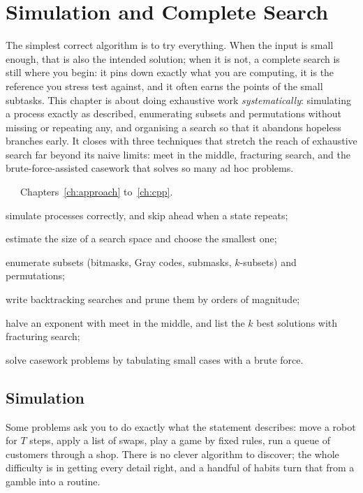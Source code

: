 \chapter{Simulation and Complete Search}\label{ch:search}

The simplest correct algorithm is to try everything. When the input is small enough, that is also the intended solution;
when it is not, a complete search is still where you begin: it pins down exactly what you are computing, it is the
reference you stress test against, and it often earns the points of the small subtasks. This chapter is about doing
exhaustive work \emph{systematically}: simulating a process exactly as described, enumerating subsets and permutations
without missing or repeating any, and organising a search so that it abandons hopeless branches early. It closes with three
techniques that stretch the reach of exhaustive search far beyond its naive limits: meet in the middle, fracturing search,
and the brute-force-assisted casework that solves so many ad hoc problems.

\begin{chapterintro}{\bronze\ \silver\ \gold\ \ioi}{Chapters~\ref{ch:approach} to~\ref{ch:cpp}.}
  \item simulate processes correctly, and skip ahead when a state repeats;
  \item estimate the size of a search space and choose the smallest one;
  \item enumerate subsets (bitmasks, Gray codes, submasks, $k$-subsets) and permutations;
  \item write backtracking searches and prune them by orders of magnitude;
  \item halve an exponent with meet in the middle, and list the $k$ best solutions with fracturing search;
  \item solve casework problems by tabulating small cases with a brute force.
\end{chapterintro}

\section[Simulation]{Simulation \hfill \bronze}\label{sec:simulation}

Some problems ask you to do exactly what the statement describes: move a robot for $T$ steps, apply a list of swaps, play a
game by fixed rules, run a queue of customers through a shop. There is no clever algorithm to discover; the whole difficulty
is in getting every detail right, and a handful of habits turn that from a gamble into a routine.

